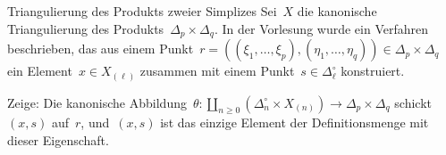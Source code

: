 \documentclass{uebblatt}
\begin{document}

\begin{aufgabe}{Triangulierung des Produkts zweier Simplizes}
Sei~$X$ die kanonische Triangulierung des Produkts~$\Delta_p \times \Delta_q$.
In der Vorlesung wurde ein Verfahren beschrieben, das aus einem
Punkt~$r = ((\xi_1,\ldots,\xi_p), (\eta_1,\ldots,\eta_q)) \in \Delta_p \times
\Delta_q$ ein Element~$x \in X_{(\ell)}$ zusammen mit einem Punkt~$s \in
\Delta_\ell^\circ$ konstruiert.

Zeige: Die kanonische Abbildung~$\theta : \coprod_{n \geq 0} (\Delta_n^\circ \times
X_{(n)}) \to \Delta_p \times \Delta_q$ schickt~$(x,s)$ auf~$r$, und~$(x,s)$ ist
das einzige Element der Definitionsmenge mit dieser Eigenschaft.
\end{aufgabe}
\end{document}
